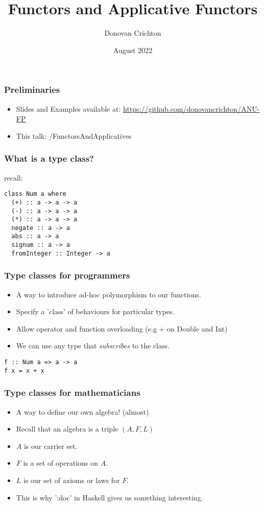 \documentclass[hyperref={colorlinks = true,linkcolor = blue, citecolor = blue, urlcolor = blue}]{beamer}
\title{Functors and Applicative Functors}
\author{Donovan Crichton}
\date{August 2022}
\begin{document}
 
\frame{\titlepage}

\begin{frame}[fragile]
  \frametitle{Preliminaries}
  \begin{itemize}
  \item Slides and Examples available at:
    \url{https://github.com/donovancrichton/ANU-FP}
  \item This talk: /FunctorsAndApplicatives
  \end{itemize}
\end{frame}

\begin{frame}[fragile]
  \frametitle{What is a type class?}
  recall:
  \begin{verbatim}
class Num a where
  (+) :: a -> a -> a
  (-) :: a -> a -> a
  (*) :: a -> a -> a
  negate :: a -> a
  abs :: a -> a
  signum :: a -> a
  fromInteger :: Integer -> a
  \end{verbatim}
\end{frame}

\begin{frame}[fragile]
  \frametitle{Type classes for programmers}
  \begin{itemize}
  \item A way to introduce ad-hoc polymorphism to our functions.
  \item Specify a 'class' of behaviours for particular types.
  \item Allow operator and function overloading (e.g + on Double and Int)
  \item We can use any type that \emph{subscribes} to the class.
  \end{itemize}
  \begin{verbatim}
f :: Num a => a -> a
f x = x + x
  \end{verbatim}

\end{frame}

\begin{frame}[fragile]
  \frametitle{Type classes for mathematicians}
  \begin{itemize}
  \item A way to define our own algebra! (almost)
  \item Recall that an algebra is a triple $(A, F, L)$
  \item $A$ is our carrier set.
  \item $F$ is a set of operations on $A$.
  \item $L$ is our set of axioms or laws for $F$.
  \item This is why ':doc' in Haskell gives us something interesting.
  \end{itemize}
\end{frame}
\end{document}
